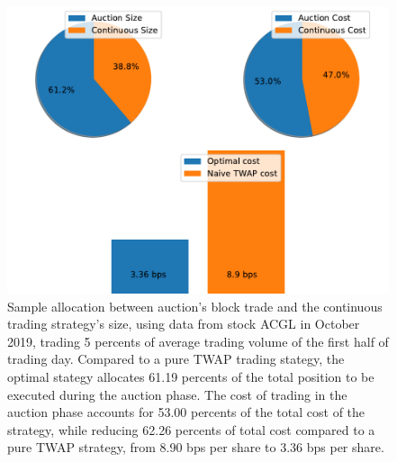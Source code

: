 
\begin{figure}[h]
  \includegraphics[width=\textwidth]{images/SampleTradeSize}
  \caption{Sample allocation between auction's block trade and the continuous trading strategy's size, using data from stock ACGL in October 2019, trading 5 percents of average trading volume of the first half of trading day. Compared to a pure TWAP trading stategy, the optimal stategy allocates 61.19 percents of the total position to be executed during the auction phase. The cost of trading in the auction phase accounts for 53.00 percents of the total cost of the strategy, while reducing 62.26 percents of total cost compared to a pure TWAP strategy, from 8.90 bps per share to 3.36 bps per share.}
  \label{fig:optimal_sizes}
\end{figure}


